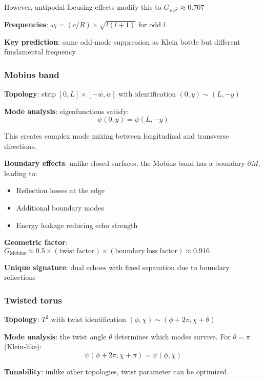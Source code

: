\documentclass[12pt]{article}
\begin{document}
However, antipodal focusing effects modify this to $G_{\mathbb{R}P^2} \approx 0.707$

\textbf{Frequencies}: $\omega_l = (c/R) \times \sqrt{l(l+1)}$ for odd $l$

\textbf{Key prediction}: same odd-mode suppression as Klein bottle but different fundamental frequency

\subsubsection{Mobius band}

\textbf{Topology}: strip $[0,L] \times [-w,w]$ with identification $(0,y) \sim (L,-y)$

\textbf{Mode analysis}: eigenfunctions satisfy:
\begin{equation}
\psi(0,y) = \psi(L,-y)
\end{equation}

This creates complex mode mixing between longitudinal and transverse directions.

\textbf{Boundary effects}: unlike closed surfaces, the Mobius band has a boundary $\partial M$, leading to:
\begin{itemize}
\item Reflection losses at the edge
\item Additional boundary modes
\item Energy leakage reducing echo strength
\end{itemize}

\textbf{Geometric factor}: $G_{\mathrm{Mobius}} \approx 0.5 \times \mathrm{(twist\ factor)} \times \mathrm{(boundary\ loss\ factor)} \approx 0.916$

\textbf{Unique signature}: dual echoes with fixed separation due to boundary reflections

\subsubsection{Twisted torus}

\textbf{Topology}: $T^2$ with twist identification $(\phi, \chi) \sim (\phi + 2\pi, \chi + \theta)$

\textbf{Mode analysis}: the twist angle $\theta$ determines which modes survive. For $\theta = \pi$ (Klein-like):
\begin{equation}
\psi(\phi + 2\pi, \chi + \pi) = \psi(\phi, \chi)
\end{equation}

\textbf{Tunability}: unlike other topologies, twist parameter can be optimized.
\end{document}
